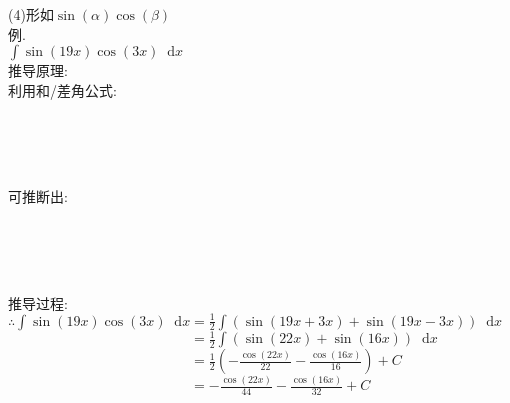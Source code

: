 \documentclass[UTF8, fontset=ubuntu, fleqn, fleqn]{ctexart}
\newcommand*{\dif}{\mathop{}\!\mathrm{d}}
\begin{document}
(4)形如$\sin(\alpha)\cos(\beta)$\\
例.\\
$\displaystyle\int\sin(19x)\cos(3x)\dif x$\\
推导原理:\\
利用和/差角公式:\\[-4ex]
\begin{center}
    \\[2ex]
    \\[2ex]
    \\[2ex]
\end{center}\vspace{1ex}
可推断出:\\[-4ex]
\begin{center}
	\\[2ex]
	\\[2ex]
	\\[2ex]
\end{center}\newpage
推导过程:\\
$\displaystyle\therefore\int\sin(19x)\cos(3x)\dif x=\frac{1}{2}\int(\sin(19x+3x)+\sin(19x-3x))\dif x$\\
$\displaystyle\phantom{\therefore\int\sin(19x)\cos(3x)\dif x}=\frac{1}{2}\int(\sin(22x)+\sin(16x))\dif x$\\
$\displaystyle\phantom{\therefore\int\sin(19x)\cos(3x)\dif x}=\frac{1}{2}\left(-\frac{\cos(22x)}{22}-\frac{\cos(16x)}{16}\right)+C$\\
$\displaystyle\phantom{\therefore\int\sin(19x)\cos(3x)\dif x}=-\frac{\cos(22x)}{44}-\frac{\cos(16x)}{32}+C$\\[4ex]
\end{document}
